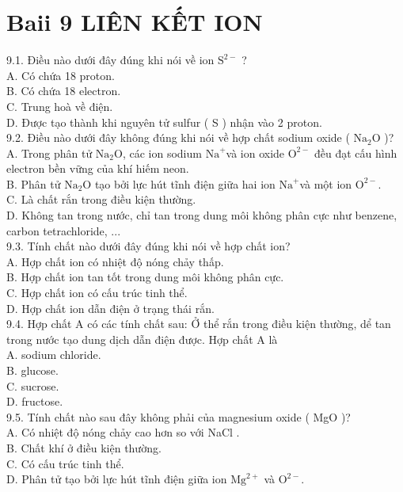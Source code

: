 \documentclass[10pt]{article}
\begin{document}
\section*{Baii 9 LIÊN KẾT ION}
9.1. Điều nào dưới đây đúng khi nói về ion $\mathrm{S}^{2-}$ ?\\
A. Có chứa 18 proton.\\
B. Có chứa 18 electron.\\
C. Trung hoà về điện.\\
D. Được tạo thành khi nguyên tử sulfur ( S ) nhận vào 2 proton.\\
9.2. Điều nào dưới đây không đúng khi nói về hợp chất sodium oxide ( $\mathrm{Na}_{2} \mathrm{O}$ )?\\
A. Trong phân tử $\mathrm{Na}_{2} \mathrm{O}$, các ion sodium $\mathrm{Na}^{+}$và ion oxide $\mathrm{O}^{2-}$ đều đạt cấu hình electron bền vững của khí hiếm neon.\\
B. Phân tử $\mathrm{Na}_{2} \mathrm{O}$ tạo bởi lực hút tĩnh điện giữa hai ion $\mathrm{Na}^{+}$và một ion $\mathrm{O}^{2-}$.\\
C. Là chất rắn trong điều kiện thường.\\
D. Không tan trong nước, chỉ tan trong dung môi không phân cực như benzene, carbon tetrachloride, ...\\
9.3. Tính chất nào dưới đây đúng khi nói về hợp chất ion?\\
A. Hợp chất ion có nhiệt độ nóng chảy thấp.\\
B. Hợp chất ion tan tốt trong dung môi không phân cực.\\
C. Hợp chất ion có cấu trúc tinh thể.\\
D. Hợp chất ion dẫn điện ở trạng thái rắn.\\
9.4. Hợp chất A có các tính chất sau: Ở thể rắn trong điều kiện thường, dể tan trong nước tạo dung dịch dẫn điện được. Hợp chất A là\\
A. sodium chloride.\\
B. glucose.\\
C. sucrose.\\
D. fructose.\\
9.5. Tính chất nào sau đây không phải của magnesium oxide ( MgO )?\\
A. Có nhiệt độ nóng chảy cao hơn so với NaCl .\\
B. Chất khí ở điều kiện thường.\\
C. Có cấu trúc tinh thể.\\
D. Phân tử tạo bởi lực hút tĩnh điện giữa ion $\mathrm{Mg}^{2+}$ và $\mathrm{O}^{2-}$.\\
\end{document}
